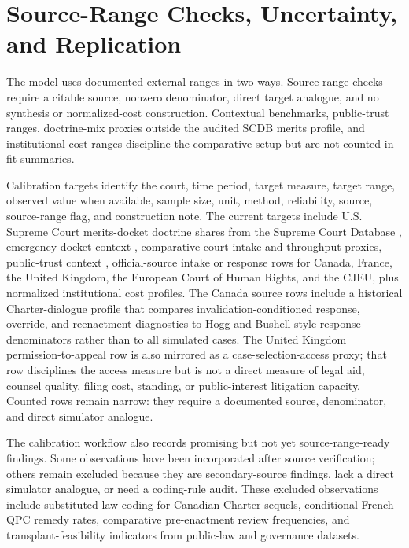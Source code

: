 \documentclass[
  journal=small,
  manuscript=research-article,
  year=2026
]{cup-journal}
\begin{document}
\section{Source-Range Checks, Uncertainty, and Replication}
\label{sec:diagnostics}

The model uses documented external ranges in two ways. Source-range checks require a citable source, nonzero denominator, direct target analogue, and no synthesis or normalized-cost construction. Contextual benchmarks, public-trust ranges, doctrine-mix proxies outside the audited SCDB merits profile, and institutional-cost ranges discipline the comparative setup but are not counted in fit summaries.

Calibration targets identify the court, time period, target measure, target range, observed value when available, sample size, unit, method, reliability, source, source-range flag, and construction note. The current targets include U.S. Supreme Court merits-docket doctrine shares from the Supreme Court Database \citep{scdb2025,scdbIssueCodebook}, emergency-docket context \citep{scotusblogInterim2024}, comparative court intake and throughput proxies, public-trust context \citep{gallupCourtApproval2024}, official-source intake or response rows for Canada, France, the United Kingdom, the European Court of Human Rights, and the CJEU, plus normalized institutional cost profiles. The Canada source rows include a historical Charter-dialogue profile that compares invalidation-conditioned response, override, and reenactment diagnostics to Hogg and Bushell-style response denominators rather than to all simulated cases. The United Kingdom permission-to-appeal row is also mirrored as a case-selection-access proxy; that row disciplines the access measure but is not a direct measure of legal aid, counsel quality, filing cost, standing, or public-interest litigation capacity. Counted rows remain narrow: they require a documented source, denominator, and direct simulator analogue.

The calibration workflow also records promising but not yet source-range-ready findings. Some observations have been incorporated after source verification; others remain excluded because they are secondary-source findings, lack a direct simulator analogue, or need a coding-rule audit. These excluded observations include substituted-law coding for Canadian Charter sequels, conditional French QPC remedy rates, comparative pre-enactment review frequencies, and transplant-feasibility indicators from public-law and governance datasets.
\end{document}
